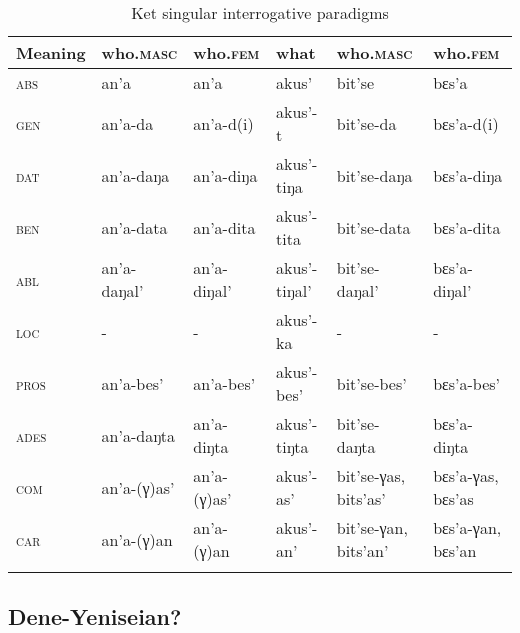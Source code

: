 \begin{table}
\caption{Ket singular interrogative paradigms \citep[140]{Werner1997a}}
\label{tab:yeni:5}

\begin{tabularx}{\textwidth}{llllQQ}
\lsptoprule

\textbf{Meaning} & \textbf{who.\textsc{masc}} & \textbf{who.\textsc{fem}} & \textbf{what} & \textbf{who.\textsc{masc}} & \textbf{who.\textsc{fem}}\\
\midrule
\textsc{abs} & an’a & an’a & akus’ & bit’se & bɛs’a\\
\textsc{gen} & an’a-da & an’a-d(i) & akus’-t & bit’se-da & bɛs’a-d(i)\\
\textsc{dat} & an’a-daŋa & an’a-diŋa & akus’-tiŋa & bit’se-daŋa & bɛs’a-diŋa\\
\textsc{ben} & an’a-data & an’a-dita & akus’-tita & bit’se-data & bɛs’a-dita\\
\textsc{abl} & an’a-daŋal’ & an’a-diŋal’ & akus’-tiŋal’ & bit’se-daŋal’ & bɛs’a-diŋal’\\
\textsc{loc} & - & - & akus’-ka & - & -\\
\textsc{pros} & an’a-bes’ & an’a-bes’ & akus’-bes’ & bit’se-bes’ & bɛs’a-bes’\\
\textsc{ades} & an’a-daŋta & an’a-diŋta & akus’-tiŋta & bit’se-daŋta & bɛs’a-diŋta\\
\textsc{com} & an’a-(γ)as’ & an’a-(γ)as’ & akus’-as’ & bit’se-γas, bits’as’ & bɛs’a-γas, bɛs’as\\
\textsc{car} & an’a-(γ)an & an’a-(γ)an & akus’-an’ & bit’se-γan, bits’an’ & bɛs’a-γan, bɛs’an\\
\lspbottomrule
\end{tabularx}
\end{table}


\subsection{Dene-Yeniseian?}\label{sec:5.13.4}

